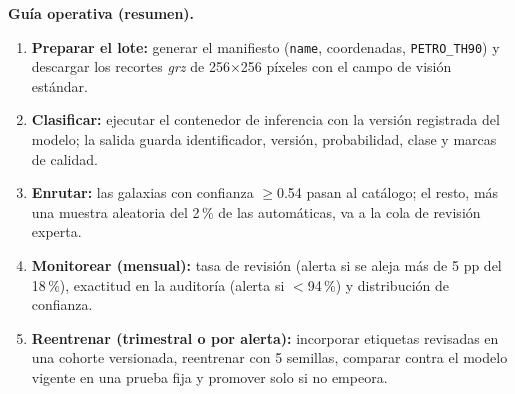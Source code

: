 \documentclass[letterpaper,11pt]{article}
\begin{document}
\noindent\textbf{Guía operativa (resumen).}
\begin{enumerate}\setlength{\itemsep}{0pt}
\item \textbf{Preparar el lote:} generar el manifiesto (\texttt{name}, coordenadas, \texttt{PETRO\_TH90}) y descargar los recortes \emph{grz} de 256×256 píxeles con el campo de visión estándar.
\item \textbf{Clasificar:} ejecutar el contenedor de inferencia con la versión registrada del modelo; la salida guarda identificador, versión, probabilidad, clase y marcas de calidad.
\item \textbf{Enrutar:} las galaxias con confianza $\geq$0.54 pasan al catálogo; el resto, más una muestra aleatoria del 2\,\% de las automáticas, va a la cola de revisión experta.
\item \textbf{Monitorear (mensual):} tasa de revisión (alerta si se aleja más de 5 pp del 18\,\%), exactitud en la auditoría (alerta si $<$94\,\%) y distribución de confianza.
\item \textbf{Reentrenar (trimestral o por alerta):} incorporar etiquetas revisadas en una cohorte versionada, reentrenar con 5 semillas, comparar contra el modelo vigente en una prueba fija y promover solo si no empeora.
\end{enumerate}
\end{document}
